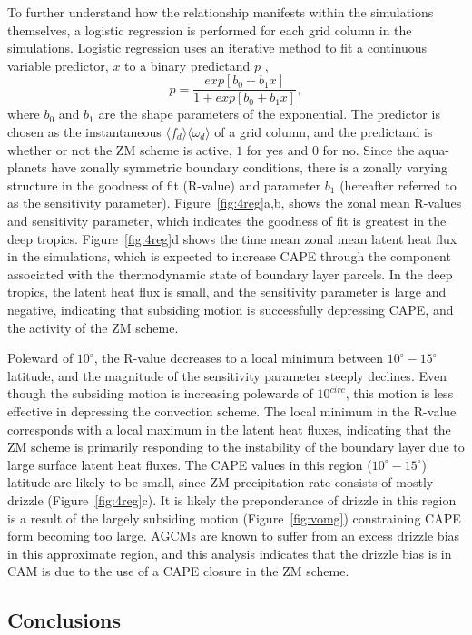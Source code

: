 To further understand how the relationship manifests within the simulations themselves, a logistic regression is performed for each grid column in the simulations. Logistic regression uses an iterative method to fit a continuous variable predictor, $x$ to a binary predictand $p$ \citep{},
\begin{equation}
p = \frac{exp{[b_0 + b_1 x]}}{1 + exp{[b_0 + b_1 x]}}, \label{eq:eq6-3}
\end{equation}
where $b_0$ and $b_1$ are the shape parameters of the exponential. The predictor is chosen as the instantaneous $\langle f_{d} \rangle \langle \omega_{d} \rangle$ of a grid column, and the predictand is whether or not the ZM scheme is active, $1$ for yes and $0$ for no. Since the aqua-planets have zonally symmetric boundary conditions, there is a zonally varying structure in the goodness of fit (R-value) and parameter $b_1$ (hereafter referred to as the sensitivity parameter). Figure~\ref{fig:4reg}a,b, shows the zonal mean R-values and sensitivity parameter, which indicates the goodness of fit is greatest in the deep tropics. Figure~\ref{fig:4reg}d shows the time mean zonal mean latent heat flux in the simulations, which is expected to increase CAPE through the component associated with the thermodynamic state of boundary layer parcels. In the deep tropics, the latent heat flux is small, and the sensitivity parameter is large and negative, indicating that subsiding motion is successfully depressing CAPE, and the activity of the ZM scheme.

Poleward of $10^{\circ}$, the R-value decreases to a local minimum between $10^{\circ} - 15^{\circ}$ latitude, and the magnitude of the sensitivity parameter steeply declines. Even though the subsiding motion is increasing polewards of $10^{circ}$, this motion is less effective in depressing the convection scheme. The local minimum in the R-value corresponds with a local maximum in the latent heat fluxes, indicating that the ZM scheme is primarily responding to the instability of the boundary layer due to large surface latent heat fluxes. The CAPE values in this region ($10^{\circ} - 15^{\circ}$) latitude are likely to be small, since ZM precipitation rate consists of mostly drizzle (Figure~\ref{fig:4reg}c). It is likely the preponderance of drizzle in this region is a result of the largely subsiding motion (Figure~\ref{fig:vomg}) constraining CAPE form becoming too large. AGCMs are known to suffer from an excess drizzle bias \citep{} in this approximate region, and this analysis indicates that the drizzle bias is in CAM is due to the use of a CAPE closure in the ZM scheme.   

\subsection{Conclusions}